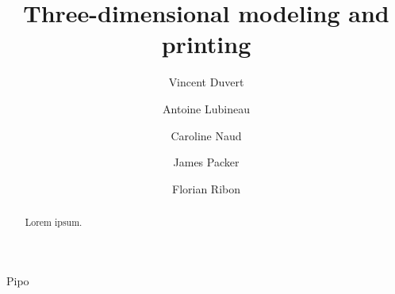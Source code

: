 \documentclass{report}
\title{Three-dimensional modeling and printing}
\author{Vincent Duvert \and Antoine Lubineau \and Caroline Naud \and James Packer \and Florian Ribon}
\begin{document}
\maketitle

\begin{abstract}
Lorem ipsum.
\end{abstract}

\tableofcontents

Pipo
\end{document}
